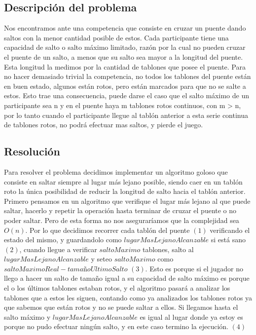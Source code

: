 \subsection{Descripci\'on del problema}

Nos encontramos ante una competencia que consiste en cruzar un puente dando saltos con la menor cantidad posible de estos.
Cada participante tiene una capacidad de salto o salto máximo limitado, razón por la cual no pueden cruzar el puente de un salto, a menos que su salto sea mayor a la longitud del puente. Esta longitud la medimos por la cantidad de tablones que posee el puente.
Para no hacer demasiado trivial la competencia, no todos los tablones del puente están en buen estado, algunos están rotos, pero están marcados para que no se salte a estos. Esto trae una consecuencia, puede darse el caso que el salto máximo de un participante sea n y en el puente haya m tablones rotos continuos, con m > n, por lo tanto cuando el participante llegue al tablón anterior a esta serie continua de tablones rotos, no podrá efectuar mas saltos, y pierde el juego. 

\subsection{Resoluci\'on}

Para resolver el problema decidimos implementar un algoritmo goloso que consiste en saltar siempre al lugar más lejano posible, siendo caer en un tablón roto la única posibilidad de reducir la longitud de salto hacia el tablón anterior.
Primero pensamos en un algoritmo que verifique el lugar más lejano al que puede saltar, hacerlo y repetir la operación hasta terminar de cruzar el puente o no poder saltar. Pero de esta forma no nos aseguraríamos que la complejidad sea $O(n)$. Por lo que decidimos recorrer cada tablón del puente $(1)$ verificando el estado del mismo, y guardandolo como $lugarMasLejanoAlcanzable$ si está sano $(2)$, cuando llegue a verificar $saltoMaximo$ tablones, salto al $lugarMasLejanoAlcanzable$ y seteo $saltoMaximo$ como $saltoMaximoReal - tamañoUltimoSalto$ $(3)$. Esto es porque si el jugador no llego a hacer un salto de tamaño igual a su capacidad de salto máximo es porque el o los últimos tablones estaban rotos, y el algoritmo pasará a analizar los tablones que a estos les siguen, contando como ya analizados los tablones rotos ya que sabemos que están rotos y no se puede saltar a ellos.
Si llegamos hasta el salto máximo y $lugarMasLejanoAlcanzable$ es igual al lugar donde ya estoy es porque no pudo efectuar ningún salto, y en este caso termino la ejecución. $(4)$

